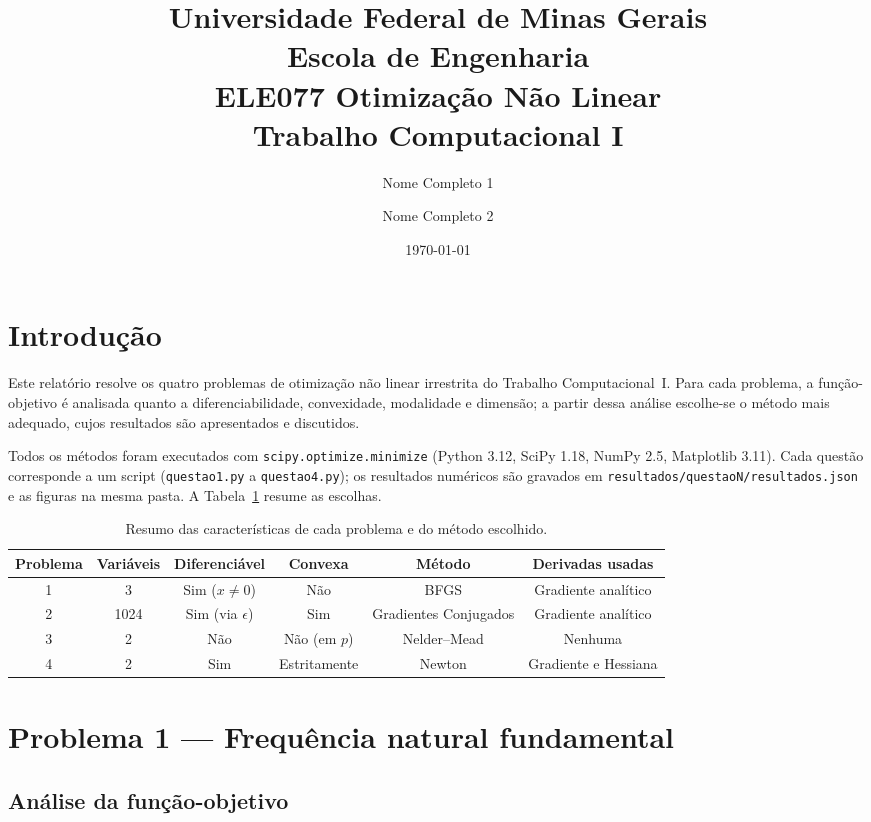 \documentclass[12pt,a4paper]{article}
\title{{\footnotesize Universidade Federal de Minas Gerais\\Escola de Engenharia\\ELE077 Otimização Não Linear\\} \vspace{5mm} Trabalho Computacional I}
\author{Nome Completo 1 \and Nome Completo 2}
\date{\today}
\begin{document}
\maketitle

\section*{Introdução}

Este relatório resolve os quatro problemas de otimização não linear irrestrita do Trabalho Computacional~I. Para cada problema, a função-objetivo é analisada quanto a diferenciabilidade, convexidade, modalidade e dimensão; a partir dessa análise escolhe-se o método mais adequado, cujos resultados são apresentados e discutidos.

Todos os métodos foram executados com \texttt{scipy.optimize.minimize} (Python 3.12, SciPy 1.18, NumPy 2.5, Matplotlib 3.11). Cada questão corresponde a um script (\texttt{questao1.py} a \texttt{questao4.py}); os resultados numéricos são gravados em \texttt{resultados/questaoN/resultados.json} e as figuras na mesma pasta. A Tabela~\ref{tab:resumo} resume as escolhas.

\begin{table}[H]
\centering
\caption{Resumo das características de cada problema e do método escolhido.}
\label{tab:resumo}
\begin{tabular}{@{}cccccc@{}}
\toprule
Problema & Variáveis & Diferenciável & Convexa & Método & Derivadas usadas \\
\midrule
1 & 3    & Sim ($x\neq 0$) & Não  & BFGS          & Gradiente analítico \\
2 & 1024 & Sim (via $\epsilon$) & Sim & Gradientes Conjugados & Gradiente analítico \\
3 & 2    & Não             & Não (em $p$) & Nelder--Mead & Nenhuma \\
4 & 2    & Sim             & Estritamente & Newton & Gradiente e Hessiana \\
\bottomrule
\end{tabular}
\end{table}

\section{Problema 1 --- Frequência natural fundamental}

\subsection{Análise da função-objetivo}
\end{document}
